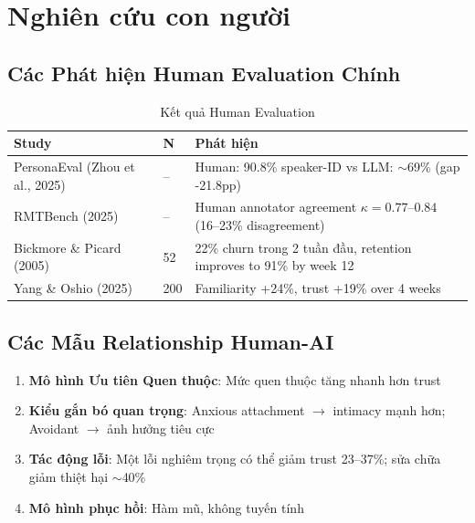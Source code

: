 \section{Nghiên cứu con người}

\subsection{Các Phát hiện Human Evaluation Chính}

\begin{table}[H]
\centering
\caption{Kết quả Human Evaluation}
\label{tab:human-studies}
\begin{tabular}{lll}
\toprule
\textbf{Study} & \textbf{N} & \textbf{Phát hiện} \\
\midrule
PersonaEval (Zhou et al., 2025) & -- & Human: 90.8\% speaker-ID vs LLM: $\sim$69\% (gap -21.8pp) \\
RMTBench (2025) & -- & Human annotator agreement $\kappa=0.77$--$0.84$ (16--23\% disagreement) \\
Bickmore \& Picard (2005) & 52 & 22\% churn trong 2 tuần đầu, retention improves to 91\% by week 12 \\
Yang \& Oshio (2025) & 200 & Familiarity +24\%, trust +19\% over 4 weeks \\
\bottomrule
\end{tabular}
\end{table}

\subsection{Các Mẫu Relationship Human-AI}

\begin{enumerate}
    \item \textbf{Mô hình Ưu tiên Quen thuộc}: Mức quen thuộc tăng nhanh hơn trust
    \item \textbf{Kiểu gắn bó quan trọng}: Anxious attachment $\to$ intimacy mạnh hơn; Avoidant $\to$ ảnh hưởng tiêu cực
    \item \textbf{Tác động lỗi}: Một lỗi nghiêm trọng có thể giảm trust 23--37\%; sửa chữa giảm thiệt hại $\sim$40\%
    \item \textbf{Mô hình phục hồi}: Hàm mũ, không tuyến tính
\end{enumerate}

